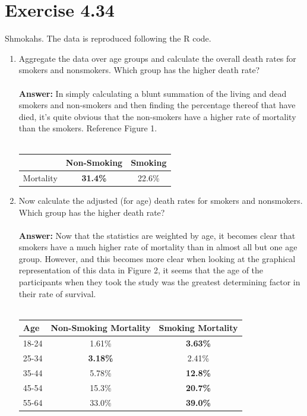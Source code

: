 \documentclass{article}
\begin{document}
	\section*{Exercise 4.34}
	
	Shmokahs. The data is reproduced following the R code.
	\begin{enumerate}[\ \ (a)\ ]
		\item Aggregate the data over age groups and calculate the overall death rates for smokers and nonsmokers. Which group has the higher death rate?
		\\\\
		\textbf{Answer:}  In simply calculating a blunt summation of the living and dead smokers and non-smokers and then finding the percentage thereof that have died, it's quite obvious that the non-smokers have a higher rate of mortality than the smokers. Reference Figure 1.\\\\
		\begin{tabular}{|l|c|c|}
			\hline 
			& Non-Smoking & Smoking \\ 
			\hline 
			Mortality & \textbf{31.4\%} & 22.6\% \\ 
			\hline 
		\end{tabular} 
		\item Now calculate the adjusted (for age) death rates for smokers and nonsmokers. Which group has the higher death rate?\\\\
		\textbf{Answer:}  Now that the statistics are weighted by age, it becomes clear that smokers have a much higher rate of mortality than in almost all but one age group. However, and this becomes more clear when looking at the graphical representation of this data in Figure 2, it seems that the age of the participants when they took the study was the greatest determining factor in their rate of survival.\\\\
		\begin{tabular}{|l|c|c|}
			\hline
			Age& Non-Smoking Mortality & Smoking Mortality \\
			\hline
			18-24 & 1.61\% & \textbf{3.63\%} \\
			\hline
			25-34 & \textbf{3.18\%} & 2.41\% \\
			\hline
			35-44 & 5.78\% & \textbf{12.8\%} \\
			\hline
			45-54 & 15.3\% & \textbf{20.7\%} \\
			\hline
			55-64 & 33.0\% & \textbf{39.0\%} \\

\end{tabular}
\end{enumerate}
\end{document}
